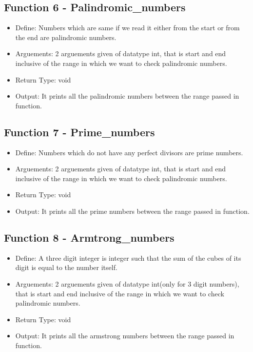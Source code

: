 \documentclass[12pt,a4paper]{article}
\begin{document}
\subsection*{Function 6 - Palindromic\_numbers}
\begin{itemize}
\item Define: Numbers which are same if we read it either from the start or from the end are palindromic numbers.
\item Arguements: 2 arguements given of datatype int, that is start and end inclusive of the range in which we want to check palindromic numbers.
\item Return Type: void
\item Output: It prints all the palindromic numbers between the range passed in function.
\end{itemize}

\subsection*{Function 7 - Prime\_numbers}
\begin{itemize}
\item Define: Numbers which do not have any perfect divisors are prime numbers.
\item Arguements: 2 arguements given of datatype int, that is start and end inclusive of the range in which we want to check palindromic numbers.
\item Return Type: void
\item Output: It prints all the prime numbers between the range passed in function.
\end{itemize}

\subsection*{Function 8 - Armtrong\_numbers}
\begin{itemize}
\item Define: A three digit integer is integer such that the sum of the cubes of its digit is equal to the number itself.
\item Arguements: 2 arguements given of datatype int(only for 3 digit numbers), that is start and end inclusive of the range in which we want to check palindromic numbers.
\item Return Type: void
\item Output: It prints all the armstrong numbers between the range passed in function.
\end{itemize}
\end{document}

